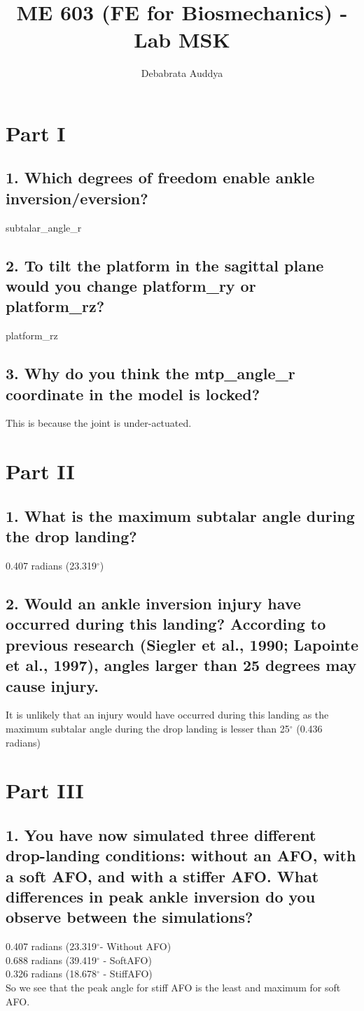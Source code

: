 \documentclass[a4paper,oneside,11pt]{report}
\title{ME 603 (FE for Biosmechanics) - Lab MSK}
\author{Debabrata Auddya}
\begin{document}
\maketitle
\section*{Part I}
\subsection*{1. Which degrees of freedom enable ankle
inversion/eversion?}
subtalar\_angle\_r
\subsection*{2. To tilt the platform in the sagittal plane
would you change platform\_ry
or platform\_rz?}
platform\_rz
\subsection*{3. Why do you think the mtp\_angle\_r
coordinate in the model is locked?}	
This is because the joint is under-actuated.
\section*{Part II}
\subsection*{1. What is the maximum subtalar angle during the drop landing?}
0.407 radians (23.319$^\circ$)
\subsection*{2. Would an ankle inversion injury have occurred during this landing? According to previous research (Siegler et al., 1990; Lapointe et al., 1997), angles larger than 25 degrees may cause injury.}
It is unlikely that an injury would have occurred during this landing as the maximum subtalar angle during the drop landing is lesser than 25$^\circ$ (0.436 radians)
\section*{Part III}
\subsection*{1. You have now simulated three different drop-landing conditions: without an AFO, with a soft AFO, and with a stiffer AFO. What differences in peak ankle inversion do you observe between the simulations?}
0.407 radians (23.319$^\circ$- Without AFO)
\\
0.688 radians (39.419$^\circ$ - SoftAFO)
\\
0.326 radians (18.678$^\circ$ - StiffAFO) \\
So we see that the peak angle for stiff AFO is the least and maximum for soft AFO. 
\end{document}
